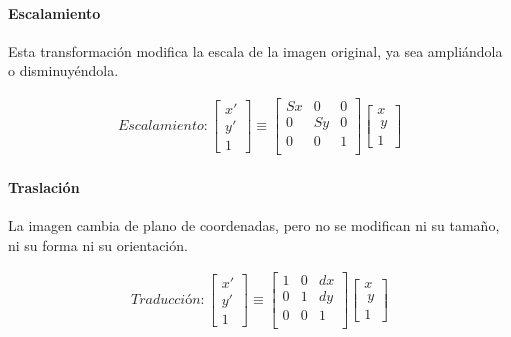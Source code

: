 \paragraph{Escalamiento} 

Esta transformación modifica la escala de la imagen original, ya sea ampliándola o disminuyéndola.



\begin{gather}
	Escalamiento:
	\begin{bmatrix} x' \\ y' \\ 1 \end{bmatrix}
	\equiv
	 \begin{bmatrix}
	  Sx & 0 & 0 \\
	  0 & Sy & 0 \\
	  0 & 0 & 1 \\
	  \end{bmatrix}
	  \begin{bmatrix} x \\\ y \\ 1 \end{bmatrix}
\end{gather}

\paragraph{Traslación}

La imagen cambia de plano de coordenadas, pero no se modifican ni su tamaño, ni su forma ni su orientación.


\begin{gather}
	Traducción:
	\begin{bmatrix} x' \\ y' \\ 1 \end{bmatrix}
	\equiv
	 \begin{bmatrix}
	  1 & 0 & dx \\
	  0 & 1 & dy \\
	  0 & 0 & 1 \\
	  \end{bmatrix}
	  \begin{bmatrix} x \\\ y \\ 1 \end{bmatrix}
\end{gather}

